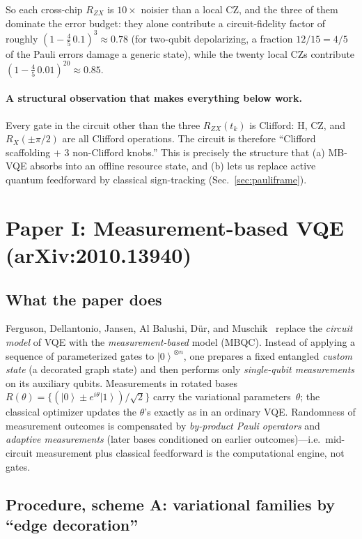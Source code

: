 \documentclass[11pt]{article}
\newcommand{\ket}[1]{\left|#1\right\rangle}
\newcommand{\RZX}{R_{ZX}}
\begin{document}
So each cross-chip $\RZX$ is $10\times$ noisier than a local CZ, and the three
of them dominate the error budget: they alone contribute a circuit-fidelity
factor of roughly $(1-\tfrac{4}{5}\,0.1)^3 \approx 0.78$ (for two-qubit
depolarizing, a fraction $12/15 = 4/5$ of the Pauli errors damage a generic
state), while the twenty local CZs contribute
$(1-\tfrac{4}{5}\,0.01)^{20}\approx 0.85$.

\paragraph{A structural observation that makes everything below work.}
Every gate in the circuit other than the three $\RZX(t_k)$ is Clifford:
H, CZ, and $R_X(\pm\pi/2)$ are all Clifford operations. The circuit is
therefore ``Clifford scaffolding $+$ 3 non-Clifford knobs.'' This is precisely
the structure that (a) MB-VQE absorbs into an offline resource state, and
(b) lets us replace active quantum feedforward by classical sign-tracking
(Sec.~\ref{sec:pauliframe}).

\section{Paper I: Measurement-based VQE (arXiv:2010.13940)}
\label{sec:mbvqe}

\subsection{What the paper does}

Ferguson, Dellantonio, Jansen, Al Balushi, D\"ur, and
Muschik~\cite{ferguson2021} replace the \emph{circuit model} of VQE with the
\emph{measurement-based} model (MBQC). Instead of applying a sequence of
parameterized gates to $\ket{0}^{\otimes n}$, one prepares a fixed entangled
\emph{custom state} (a decorated graph state) and then performs only
\emph{single-qubit measurements} on its auxiliary qubits. Measurements in
rotated bases $R(\theta) = \{(\ket{0} \pm e^{i\theta}\ket{1})/\sqrt{2}\}$ carry
the variational parameters~$\theta$; the classical optimizer updates the
$\theta$'s exactly as in an ordinary VQE. Randomness of measurement outcomes
is compensated by \emph{by-product Pauli operators} and \emph{adaptive
measurements} (later bases conditioned on earlier outcomes)---i.e.\ mid-circuit
measurement plus classical feedforward is the computational engine, not gates.

\subsection{Procedure, scheme A: variational families by ``edge decoration''}
\end{document}
